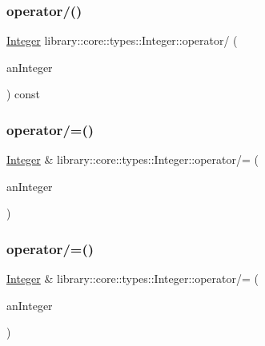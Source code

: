 \subsubsection{\texorpdfstring{operator/()}{operator/()}\hspace{0.1cm}{\footnotesize\ttfamily [2/2]}}
{\footnotesize\ttfamily \hyperlink{classlibrary_1_1core_1_1types_1_1_integer}{Integer} library\+::core\+::types\+::\+Integer\+::operator/ (\begin{DoxyParamCaption}\item[{const \hyperlink{classlibrary_1_1core_1_1types_1_1_integer_a623afb1580f870fd8a1997b1c12c917d}{Integer\+::\+Value\+Type} \&}]{an\+Integer }\end{DoxyParamCaption}) const}

\mbox{\label{classlibrary_1_1core_1_1types_1_1_integer_aaf72e97cae17baba1b2bd216898df8a8}} 
\subsubsection{\texorpdfstring{operator/=()}{operator/=()}\hspace{0.1cm}{\footnotesize\ttfamily [1/2]}}
{\footnotesize\ttfamily \hyperlink{classlibrary_1_1core_1_1types_1_1_integer}{Integer} \& library\+::core\+::types\+::\+Integer\+::operator/= (\begin{DoxyParamCaption}\item[{const \hyperlink{classlibrary_1_1core_1_1types_1_1_integer}{Integer} \&}]{an\+Integer }\end{DoxyParamCaption})}

\mbox{\label{classlibrary_1_1core_1_1types_1_1_integer_a5358ac7b2be0f83ebd2fccb1e9593e24}} 
\subsubsection{\texorpdfstring{operator/=()}{operator/=()}\hspace{0.1cm}{\footnotesize\ttfamily [2/2]}}
{\footnotesize\ttfamily \hyperlink{classlibrary_1_1core_1_1types_1_1_integer}{Integer} \& library\+::core\+::types\+::\+Integer\+::operator/= (\begin{DoxyParamCaption}\item[{const \hyperlink{classlibrary_1_1core_1_1types_1_1_integer_a623afb1580f870fd8a1997b1c12c917d}{Integer\+::\+Value\+Type} \&}]{an\+Integer }\end{DoxyParamCaption})}


